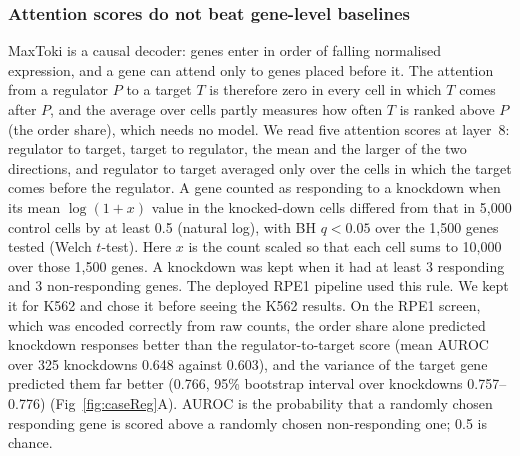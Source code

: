\documentclass[10pt,letterpaper]{article}
\begin{document}
\subsubsection*{Attention scores do not beat gene-level baselines}
MaxToki is a causal decoder: genes enter in order of falling normalised
expression, and a gene can attend only to genes placed before it. The
attention from a regulator $P$ to a target $T$ is therefore zero in every
cell in which $T$ comes after $P$, and the average over cells partly
measures how often $T$ is ranked above $P$ (the order share), which
needs no model. We read five attention scores at layer~8: regulator to target, target to
regulator, the mean and the larger of the two directions, and regulator
to target averaged only over the cells in which the target comes before
the regulator. A gene counted as responding to a knockdown when its mean
$\log(1+x)$ value in the knocked-down cells differed from that in 5,000
control cells by at least 0.5 (natural log), with BH $q < 0.05$ over the
1,500 genes tested (Welch $t$-test). Here $x$ is the count scaled so that
each cell sums to 10,000 over those 1,500 genes. A knockdown was kept
when it had at least 3 responding and 3 non-responding genes. The
deployed RPE1 pipeline used this rule. We kept it for K562 and chose it
before seeing the K562 results. On the RPE1 screen, which was encoded
correctly from raw counts, the order share alone predicted knockdown responses better than
the regulator-to-target score (mean AUROC over 325 knockdowns 0.648
against 0.603), and the variance of the target gene predicted them far
better (0.766, 95\% bootstrap interval over knockdowns 0.757--0.776)
(Fig~\ref{fig:caseReg}A). AUROC is the probability that a randomly chosen
responding gene is scored above a randomly chosen non-responding one;
0.5 is chance.
\end{document}
